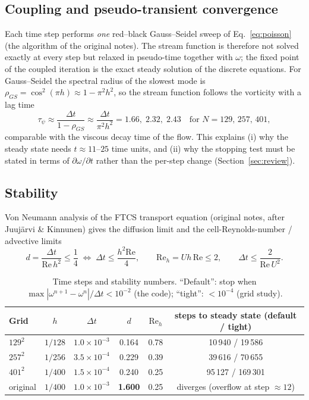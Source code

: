 \subsection{Coupling and pseudo-transient convergence}
Each time step performs \emph{one} red--black Gauss--Seidel sweep of Eq.~\eqref{eq:poisson} (the algorithm of the original notes). The stream function is therefore not solved exactly at every step but relaxed in pseudo-time together with $\omega$; the fixed point of the coupled iteration is the exact steady solution of the discrete equations. For Gauss--Seidel the spectral radius of the slowest mode is $\rho_{GS}=\cos^2(\pi h)\approx1-\pi^2h^2$, so the stream function follows the vorticity with a lag time
\begin{equation}
\tau_\psi\approx\frac{\Delta t}{1-\rho_{GS}}\approx\frac{\Delta t}{\pi^2h^2}=1.66,\;2.32,\;2.43\quad\text{for }N=129,\,257,\,401,
\end{equation}
comparable with the viscous decay time of the flow. This explains (i) why the steady state needs $t\approx11$--$25$ time units, and (ii) why the stopping test must be stated in terms of $\partial\omega/\partial t$ rather than the per-step change (Section~\ref{sec:review}).

\subsection{Stability}
Von Neumann analysis of the FTCS transport equation (original notes, after Juuj\"arvi \& Kinnunen) gives the diffusion limit and the cell-Reynolds-number / advective limits
\begin{equation}
d=\frac{\Delta t}{\mathrm{Re}\,h^2}\le\frac14\;\Leftrightarrow\;\Delta t\le\frac{h^2\mathrm{Re}}{4},\qquad
\mathrm{Re}_h=Uh\,\mathrm{Re}\le2,\qquad \Delta t\le\frac{2}{\mathrm{Re}\,U^2}.
\end{equation}
\begin{table}[H]\centering\small
\begin{tabular}{lccccc}\toprule
Grid & $h$ & $\Delta t$ & $d$ & $\mathrm{Re}_h$ & steps to steady state (default / tight)\\\midrule
$129^2$ & $1/128$ & $1.0\times10^{-3}$ & 0.164 & 0.78 & 10\,940 / 19\,586\\
$257^2$ & $1/256$ & $3.5\times10^{-4}$ & 0.229 & 0.39 & 39\,616 / 70\,655\\
$401^2$ & $1/400$ & $1.5\times10^{-4}$ & 0.240 & 0.25 & 95\,127 / 169\,301\\
original & $1/400$ & $1.0\times10^{-3}$ & \textbf{1.600} & 0.25 & diverges (overflow at step $\approx12$)\\\bottomrule
\end{tabular}\caption{Time steps and stability numbers. ``Default'': stop when $\max|\omega^{n+1}-\omega^n|/\Delta t<10^{-2}$ (the code); ``tight'': $<10^{-4}$ (grid study).}\end{table}

